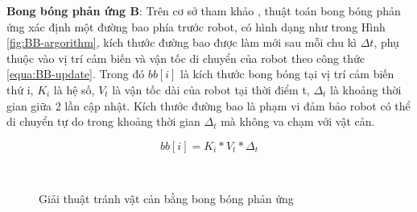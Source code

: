 \textbf{Bong bóng phản ứng B}:
Trên cơ sở tham khảo \cite{Susnea2009}, thuật toán bong bóng phản ứng xác định một đường bao phía trước robot, có hình dạng như trong Hình \ref{fig:BB-argorithm}, kích thước đường bao được làm mới sau mỗi chu kì ${\Delta}{t}$, phụ thuộc vào vị trí cảm biến và vận tốc di chuyển của robot theo công thức \ref{equa:BB-update}. Trong đó $bb[i]$ là kích thước bong bóng tại vị trí cảm biến thứ i, $K_i$ là hệ số, $V_t$ là vận tốc dài của robot tại thời điểm t, $\Delta_t$ là khoảng thời gian giữa 2 lần cập nhật.
Kích thước đường bao là phạm vi đảm bảo robot có thể di chuyển tự do trong khoảng thời gian $\Delta_t$ mà không va chạm với vật cản.

\begin{equation}
    bb[i] = K_i*V_t*\Delta_t
    \label{equa:BB-update}
\end{equation}

\begin{figure}[htbp]
    \centering
     \\
    \caption{Giải thuật tránh vật cản bằng bong bóng phản ứng}
    \label{fig:BB-avoidance}
\end{figure}

